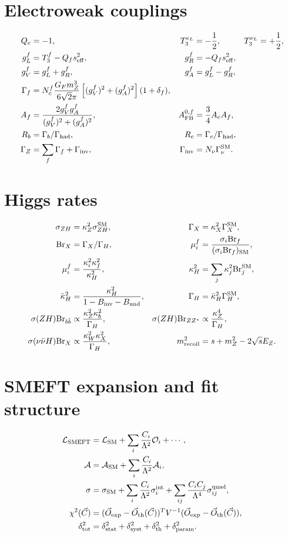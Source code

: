 \documentclass[11pt,a4paper]{report}
\newcommand{\br}{\mathrm{Br}}
\begin{document}
\section{Electroweak couplings}
\begin{align}
Q_e&=-1, & T_3^{e_L}&=-\frac12, & T_3^{\nu_L}&=+\frac12,\\
g_L^f&=T_3^f-Q_f s_{\rm eff}^2, & g_R^f&=-Q_f s_{\rm eff}^2,\\
g_V^f&=g_L^f+g_R^f, & g_A^f&=g_L^f-g_R^f,\\
\Gamma_f&=N_c^f\frac{G_Fm_Z^3}{6\sqrt2\pi}\left[(g_V^f)^2+(g_A^f)^2\right](1+\delta_f),\\
A_f&=\frac{2g_V^fg_A^f}{(g_V^f)^2+(g_A^f)^2}, & A_{\rm FB}^{0,f}&=\frac34 A_eA_f,\\
R_b&=\Gamma_b/\Gamma_{\rm had}, & R_c&=\Gamma_c/\Gamma_{\rm had},\\
\Gamma_Z&=\sum_f\Gamma_f+\Gamma_{\rm inv}, & \Gamma_{\rm inv}&=N_\nu\Gamma_\nu^{\rm SM}.
\end{align}
\section{Higgs rates}
\begin{align}
\sigma_{ZH}&=\kappa_Z^2\sigma_{ZH}^{\rm SM}, & \Gamma_X&=\kappa_X^2\Gamma_X^{\rm SM},\\
\br_X&=\Gamma_X/\Gamma_H, & \mu_i^f&=\frac{\sigma_i\br_f}{(\sigma_i\br_f)_{\rm SM}},\\
\mu_i^f&=\frac{\kappa_i^2\kappa_f^2}{\kappa_H^2}, & \kappa_H^2&=\sum_j\kappa_j^2\br_j^{\rm SM},\\
\bar\kappa_H^2&=\frac{\kappa_H^2}{1-B_{\rm inv}-B_{\rm und}}, & \Gamma_H&=\bar\kappa_H^2\Gamma_H^{\rm SM},\\
\sigma(ZH)\br_{b\bar b}&\propto\frac{\kappa_Z^2\kappa_b^2}{\Gamma_H}, & \sigma(ZH)\br_{ZZ^*}&\propto\frac{\kappa_Z^4}{\Gamma_H},\\
\sigma(\nu\bar\nu H)\br_X&\propto\frac{\kappa_W^2\kappa_X^2}{\Gamma_H}, & m_{\rm recoil}^2&=s+m_Z^2-2\sqrt{s}E_Z.
\end{align}
\section{SMEFT expansion and fit structure}
\begin{align}
\mathcal L_{\rm SMEFT}&=\mathcal L_{\rm SM}+\sum_i\frac{C_i}{\Lambda^2}\mathcal O_i+\cdots,\\
\mathcal A&=\mathcal A_{\rm SM}+\sum_i\frac{C_i}{\Lambda^2}\mathcal A_i,\\
\sigma&=\sigma_{\rm SM}+\sum_i\frac{C_i}{\Lambda^2}\sigma_i^{\rm int}+\sum_{ij}\frac{C_iC_j}{\Lambda^4}\sigma_{ij}^{\rm quad},\\
\chi^2(\vec C)&=(\vec O_{\rm exp}-\vec O_{\rm th}(\vec C))^TV^{-1}(\vec O_{\rm exp}-\vec O_{\rm th}(\vec C)),\\
\delta_{\rm tot}^2&=\delta_{\rm stat}^2+\delta_{\rm syst}^2+\delta_{\rm th}^2+\delta_{\rm param}^2.
\end{align}
\end{document}
